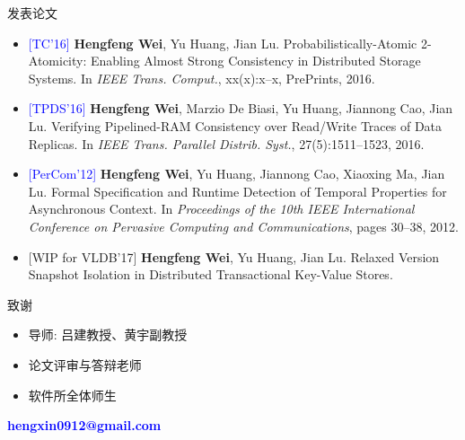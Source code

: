 \begin{frame}{发表论文}
  \begin{itemize}
	\item \textcolor{blue}{[TC'16]} {\bf Hengfeng Wei}, Yu Huang, Jian Lu. 
	  Probabilistically-Atomic 2-Atomicity: Enabling Almost Strong Consistency in Distributed Storage Systems. 
	  In {\it IEEE Trans. Comput.}, xx(x):x--x, PrePrints, 2016.
	\item \textcolor{blue}{[TPDS'16]} {\bf Hengfeng Wei}, Marzio De Biasi, Yu Huang, Jiannong Cao, Jian Lu. 
	  Verifying Pipelined-RAM Consistency over Read/Write Traces of Data Replicas.
	  In {\it IEEE Trans. Parallel Distrib. Syst.}, 27(5):1511--1523, 2016.
	\item \textcolor{blue}{[PerCom'12]} {\bf Hengfeng Wei}, Yu Huang, Jiannong Cao, Xiaoxing Ma, Jian Lu. 
	  Formal Specification and Runtime Detection of Temporal Properties for Asynchronous Context. 
	  In {\it Proceedings of the 10th IEEE International Conference on Pervasive Computing and Communications},
	  pages 30--38, 2012.
	\item \textcolor{blue!50!gray}{[WIP for VLDB'17]} {\bf Hengfeng Wei}, Yu Huang, Jian Lu.
	  Relaxed Version Snapshot Isolation in Distributed Transactional Key-Value Stores. 
  \end{itemize}
\end{frame}
\begin{frame}{致谢}
  \begin{itemize}
	\setlength{\itemsep}{15pt}
	\item 导师: 吕建教授、黄宇副教授
	\item 论文评审与答辩老师
	\item 软件所全体师生
  \end{itemize}
\end{frame}
\begin{frame}[noframenumbering]
  \vspace{-0.8cm}
  \begin{center}
    \textcolor{blue}{\bf \large hengxin0912@gmail.com}
  \end{center}
  \vspace{-0.5cm}
\end{frame}
